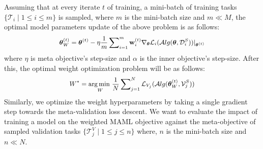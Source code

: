 Assuming that at every iterate $t$ of training, a mini-batch of training tasks $\{{\mathcal{T}_i} \mid 1 \leq i \leq m \}$ is sampled, where $m$ is the mini-batch size and $m \ll M$, the optimal model parameters update of the above problem is as follows: 
\begin{equation}
\small
    \begin{aligned}
    \label{online-equation}
    \boldsymbol{\theta}^{(t)}_{W} = \boldsymbol{\theta}^{(t)} - \eta \frac{1}{m}\sum\nolimits_{i=1}^{m} \mathbf{w}_i^{(t)} \nabla_{\boldsymbol{\theta}} \mathcal{L}_i(\mathcal{A}lg(\boldsymbol{\theta},\mathcal{D}_i^{S}))|_{\boldsymbol{\theta}^{(t)}}
    \end{aligned}
\end{equation}
where $\eta$ is meta objective's step-size and $\alpha$ is the inner objective's step-size. 
After this, the optimal weight optimization problem will be as follows:
\begin{equation}
\small
    \begin{aligned}
        W^{*} = {\operatorname*{arg\,min\hspace{1mm}}_{W}} \frac{1}{N} \sum\nolimits_{j=1}^{N}\mathcal{L}_{V_j}(\mathcal{A}lg(\boldsymbol{\theta}_{W}^{(t)},\mathcal{V}_j^{S}))
    \end{aligned}
\end{equation}
Similarly, we optimize the weight hyperparameters by taking a single gradient step towards the meta-validation loss descent. We want to evaluate the impact of training a model on the weighted MAML objective against the meta-objective of sampled validation tasks $\{\mathcal{T}_{j}^{V} \mid 1 \leq j \leq n \}$ where, $n$ is the mini-batch size and $n \ll N$.
